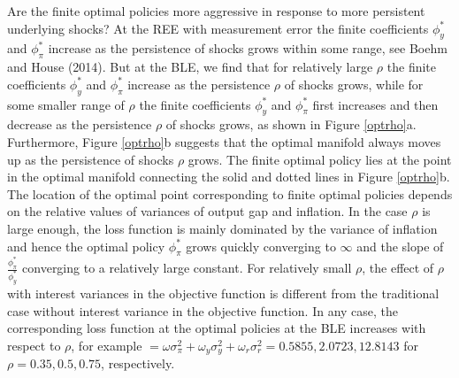 \def\CTeXPreproc{Created by ctex v0.2.5, don't edit!}\documentclass[12pt]{article}
\numberwithin{equation}{section}
\begin{document}
Are the finite optimal policies more aggressive in response to more persistent underlying shocks? At the REE with measurement error the finite coefficients $\phi_y^*$ and $\phi_\pi^*$ increase as the persistence of shocks grows within some range, see Boehm and House (2014). But at the BLE, we find that for relatively large $\rho$ the finite coefficients $\phi_y^*$ and $\phi_\pi^*$ increase as the persistence $\rho$ of shocks grows, while for some smaller range of $\rho$ the finite coefficients $\phi_y^*$ and $\phi_\pi^*$ first increases and then decrease as the persistence $\rho$ of shocks grows, as shown in Figure \ref{optrho}a. Furthermore, Figure \ref{optrho}b suggests that the optimal manifold always moves up as the persistence of shocks $\rho$ grows. The finite optimal policy lies at the point in the optimal manifold connecting the solid and dotted lines in Figure \ref{optrho}b. The location of the optimal point corresponding to finite optimal policies depends on the relative values of variances of output gap and inflation. In the case $\rho$ is large enough, the loss function is mainly dominated by the variance of inflation and hence the optimal policy $\phi_{\pi}^*$ grows quickly converging to $\infty$ and the slope of $\frac{\phi_\pi^*}{\phi_y^*}$ converging to a relatively large constant. For relatively small $\rho$, the effect of $\rho$ with interest variances in the objective function is different from the traditional case without interest variance in the objective function. In any case, the corresponding loss function at the optimal policies at the BLE increases with respect to $\rho$, for example $=\omega\sigma_\pi^2+\omega_y\sigma_y^2+\omega_r\sigma_r^2= 0.5855, 2.0723, 12.8143$ for $\rho=0.35, 0.5, 0.75$, respectively.

\end{document}
